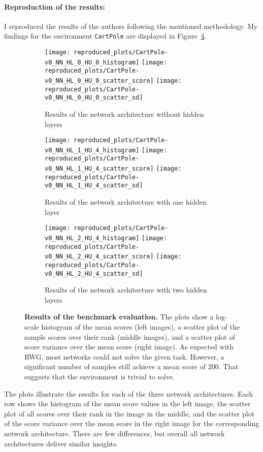 \paragraph*{Reproduction of the results:} I reproduced the results of the authors following the mentioned methodology. My findings for the environment \verb|CartPole| are displayed in Figure~\ref{fig:plots_reproduced}.
\begin{figure}[ht]
\centering
\begin{subfigure}{\textwidth}
  \centering
  \texttt{[image: reproduced\_plots/CartPole-v0\_NN\_HL\_0\_HU\_0\_histogram]}
  \texttt{[image: reproduced\_plots/CartPole-v0\_NN\_HL\_0\_HU\_0\_scatter\_score]}
  \texttt{[image: reproduced\_plots/CartPole-v0\_NN\_HL\_0\_HU\_0\_scatter\_sd]}
    \caption{Results of the network architecture without hidden layers}
    \label{fig:plots_reproduced_first}
\end{subfigure}
\begin{subfigure}{\textwidth}
  \centering
  \texttt{[image: reproduced\_plots/CartPole-v0\_NN\_HL\_1\_HU\_4\_histogram]}
  \texttt{[image: reproduced\_plots/CartPole-v0\_NN\_HL\_1\_HU\_4\_scatter\_score]}
  \texttt{[image: reproduced\_plots/CartPole-v0\_NN\_HL\_1\_HU\_4\_scatter\_sd]}
    \caption{Results of the network architecture with one hidden layer}
    \label{fig:plots_reproduced_second}
\end{subfigure}
\begin{subfigure}{\textwidth}
  \centering
  \texttt{[image: reproduced\_plots/CartPole-v0\_NN\_HL\_2\_HU\_4\_histogram]}
  \texttt{[image: reproduced\_plots/CartPole-v0\_NN\_HL\_2\_HU\_4\_scatter\_score]}
  \texttt{[image: reproduced\_plots/CartPole-v0\_NN\_HL\_2\_HU\_4\_scatter\_sd]}
    \caption{Results of the network architecture with two hidden layers}
    \label{fig:plots_reproduced_third}
\end{subfigure}
\caption[Results of the benchmark evaluation]{
  \textbf{Results of the benchmark evaluation.}
   The plots show a log-scale histogram of the mean scores (left images), a scatter plot of the sample scores over their rank (middle images), and a scatter plot of score variance over the mean score (right image). As expected with RWG, most networks could not solve the given task. However, a significant number of samples still achieve a mean score of 200. That suggests that the environment is trivial to solve.
}
\label{fig:plots_reproduced}
\end{figure}
The plots illustrate the results for each of the three network architectures. Each row shows the histogram of the mean score values in the left image, the scatter plot of all scores over their rank in the image in the middle, and the scatter plot of the score variance over the mean score in the right image for the corresponding network architecture. There are few differences, but overall all network architectures deliver similar insights.

